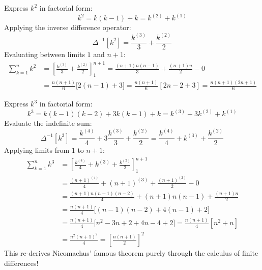 \begin{examplebox}[Manuscript Problem: Sum of Squares $\sum_{k=1}^n k^2$ (Page 50)]
Express $k^2$ in factorial form:
\begin{equation}
    k^2 = k(k-1) + k = k^{(2)} + k^{(1)}
\end{equation}
Applying the inverse difference operator:
\begin{equation}
    \Delta^{-1}[k^2] = \frac{k^{(3)}}{3} + \frac{k^{(2)}}{2}
\end{equation}
Evaluating between limits $1$ and $n + 1$:
\begin{align}
    \sum_{k=1}^n k^2 &= \left[ \frac{k^{(3)}}{3} + \frac{k^{(2)}}{2} \right]_1^{n+1} = \frac{(n+1)n(n-1)}{3} + \frac{(n+1)n}{2} - 0 \nonumber \\
    &= \frac{n(n+1)}{6}\big[ 2(n-1) + 3 \big] = \frac{n(n+1)}{6}[2n - 2 + 3] = \boxed{\frac{n(n+1)(2n+1)}{6}}
\end{align}
\end{examplebox}

\begin{examplebox}[Manuscript Problem: Sum of Cubes $\sum_{k=1}^n k^3$ (Pages 50--51)]
Express $k^3$ in factorial form:
\begin{equation}
    k^3 = k(k-1)(k-2) + 3k(k-1) + k = k^{(3)} + 3 k^{(2)} + k^{(1)}
\end{equation}
Evaluate the indefinite sum:
\begin{equation}
    \Delta^{-1}[k^3] = \frac{k^{(4)}}{4} + 3\frac{k^{(3)}}{3} + \frac{k^{(2)}}{2} = \frac{k^{(4)}}{4} + k^{(3)} + \frac{k^{(2)}}{2}
\end{equation}
Applying limits from $1$ to $n+1$:
\begin{align}
    \sum_{k=1}^n k^3 &= \left[ \frac{k^{(4)}}{4} + k^{(3)} + \frac{k^{(2)}}{2} \right]_1^{n+1} \nonumber \\
    &= \frac{(n+1)^{(4)}}{4} + (n+1)^{(3)} + \frac{(n+1)^{(2)}}{2} - 0 \nonumber \\
    &= \frac{(n+1)n(n-1)(n-2)}{4} + (n+1)n(n-1) + \frac{(n+1)n}{2} \nonumber \\
    &= \frac{n(n+1)}{4}\Big[ (n-1)(n-2) + 4(n-1) + 2 \Big] \nonumber \\
    &= \frac{n(n+1)}{4}\big[ n^2 - 3n + 2 + 4n - 4 + 2 \big] = \frac{n(n+1)}{4}[n^2 + n] \nonumber \\
    &= \frac{n^2(n+1)^2}{4} = \boxed{\left[\frac{n(n+1)}{2}\right]^2}
\end{align}
This re-derives Nicomachus' famous theorem purely through the calculus of finite differences!
\end{examplebox}

